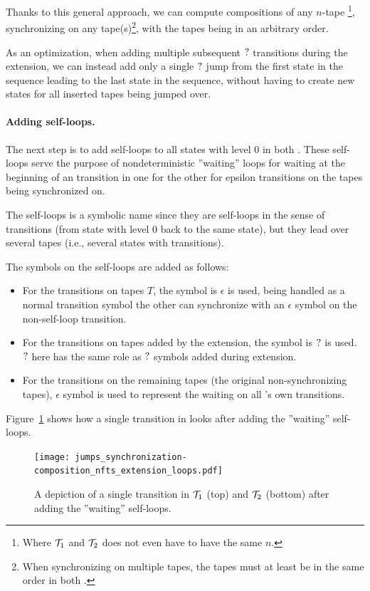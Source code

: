 Thanks to this general approach, we can compute compositions of any $n$-tape \nfts\footnote{Where $\mathcal{T}_1$ and $\mathcal{T}_2$ does not even have to have the same $n$.}, synchronizing on any tape(s)\footnote{When synchronizing on multiple tapes, the tapes must at least be in the same order in both \nfts.}, with the tapes being in an arbitrary order.

As an optimization, when adding multiple subsequent $?$ transitions during the extension, we can instead add only a single $?$ jump from the first state in the sequence leading to the last state in the sequence, without having to create new states for all inserted tapes being jumped over.

\paragraph{Adding self-loops.}
The next step is to add self-loops to all states with level $0$ in both \nfts.
These self-loops serve the purpose of nondeterministic ''waiting'' loops for waiting at the beginning of an \nft transition in one \nft for the other \nft for epsilon transitions on the tapes being synchronized on.

The self-loops is a symbolic name since they are self-loops in the sense of \nft transitions (from state with level $0$ back to the same state), but they lead over several tapes (i.e., several states with transitions).

The symbols on the self-loops are added as follows:
\begin{itemize}
  \item For the transitions on tapes $T$, the symbol is $\epsilon$ is used, being handled as a normal transition symbol the other \nft can synchronize with an $\epsilon$ symbol on the non-self-loop transition.
  \item For the transitions on tapes added by the extension, the symbol is $?$ is used.
  $?$ here has the same role as $?$ symbols added during extension.
  \item For the transitions on the remaining tapes (the original non-synchronizing tapes), $\epsilon$ symbol is used to represent the waiting on all \nft's own transitions.
\end{itemize}

\begin{example}
  Figure~\ref{fig:composition_nfts_extension_loops} shows how a single transition in \nfts looks after adding the ''waiting'' self-loops.
  \begin{figure}[ht]
    \centering
    \texttt{[image: jumps\_synchronization-composition\_nfts\_extension\_loops.pdf]}
    \caption{
      A depiction of a single transition in \nfts $\mathcal{T}_1$ (top) and $\mathcal{T}_2$ (bottom) after adding the ''waiting'' self-loops.
    }
    \label{fig:composition_nfts_extension_loops}
  \end{figure}
\end{example}

